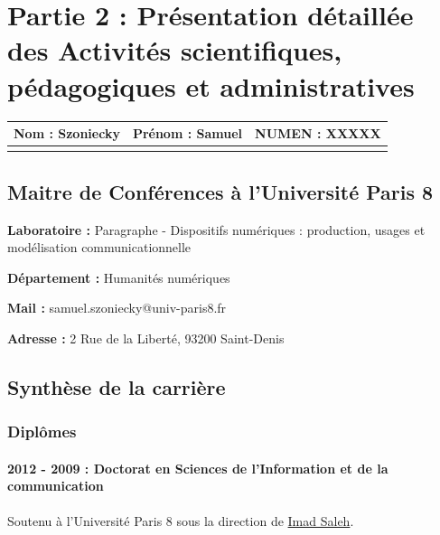 \documentclass[
  a4paper,
  DIV=11,
  numbers=noendperiod]{scrreprt}
\begin{document}
\chapter{Partie 2 : Présentation détaillée des Activités scientifiques,
pédagogiques et administratives}\label{sec-CVpartie2}

\begin{longtable}[]{@{}lcr@{}}
\toprule\noalign{}
Nom : Szoniecky & Prénom : Samuel & NUMEN : XXXXX \\
\midrule\noalign{}
\endhead
\bottomrule\noalign{}
\endlastfoot
\end{longtable}

\section*{Maitre de Conférences à l'Université Paris
8}\label{maitre-de-confuxe9rences-uxe0-luniversituxe9-paris-8}

\textbf{Laboratoire :} Paragraphe - Dispositifs numériques : production,
usages et modélisation communicationnelle

\textbf{Département :} Humanités numériques

\textbf{Mail :} samuel.szoniecky@univ-paris8.fr

\textbf{Adresse :} 2 Rue de la Liberté, 93200 Saint-Denis

\section{Synthèse de la carrière}\label{synthuxe8se-de-la-carriuxe8re}

\subsection{Diplômes}\label{dipluxf4mes}

\subsubsection*{2012 - 2009 : Doctorat en Sciences de l'Information et
de la
communication}\label{doctorat-en-sciences-de-linformation-et-de-la-communication}

Soutenu à l'Université Paris 8 sous la direction de
\href{http://localhost/samszo/omk/s/fiches/item/61148}{Imad Saleh}.
\end{document}

